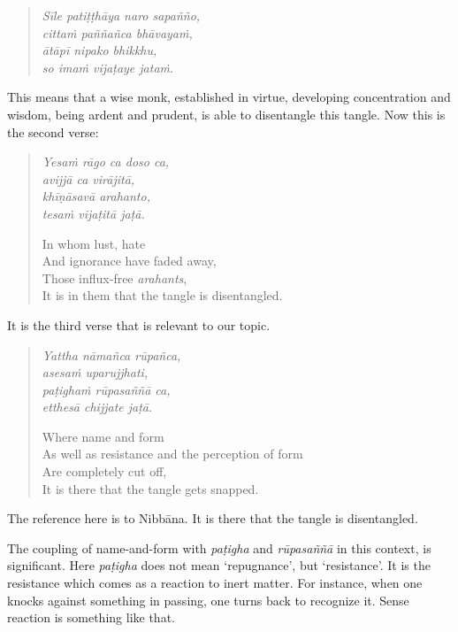 \begin{quote}
\emph{Sīle patiṭṭhāya naro sapañño,}\\
\emph{cittaṁ paññañca bhāvayaṁ,}\\
\emph{ātāpī nipako bhikkhu,}\\
\emph{so imaṁ vijaṭaye jataṁ}.
\end{quote}

This means that a wise monk, established in virtue, developing concentration and wisdom, being ardent and prudent, is able to disentangle this tangle. Now this is the second verse:

\clearpage

\begin{quote}
\emph{Yesaṁ rāgo ca doso ca,}\\
\emph{avijjā ca virājitā,}\\
\emph{khīṇāsavā arahanto,}\\
\emph{tesaṁ vijaṭitā jaṭā.}

In whom lust, hate\\
And ignorance have faded away,\\
Those influx-free \emph{arahants},\\
It is in them that the tangle is disentangled.
\end{quote}

It is the third verse that is relevant to our topic.

\begin{quote}
\emph{Yattha nāmañca rūpañca,}\\
\emph{asesaṁ uparujjhati,}\\
\emph{paṭighaṁ rūpasaññā ca,}\\
\emph{etthesā chijjate jaṭā}.

Where name and form\\
As well as resistance and the perception of form\\
Are completely cut off,\\
It is there that the tangle gets snapped.
\end{quote}

The reference here is to Nibbāna. It is there that the tangle is disentangled.

The coupling of name-and-form with \emph{paṭigha} and \emph{rūpasaññā} in this context, is significant. Here \emph{paṭigha} does not mean `repugnance', but `resistance'. It is the resistance which comes as a reaction to inert matter. For instance, when one knocks against something in passing, one turns back to recognize it. Sense reaction is something like that.

